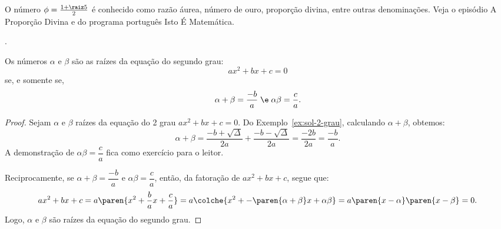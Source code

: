 \begin{remark}
	O número $\phi = \frac {1 + \raiz 5} 2$ é conhecido como razão áurea, número de ouro, proporção divina, entre outras denominações.
	Veja o episódio A Proporção Divina  e  do programa português Isto É Matemática.
\end{remark}

\begin{onlineact}
	.
\end{onlineact}

\begin{theorem}
	Os números $\alpha$ e $\beta$ são as raízes da equação do segundo grau:
	\[
		ax^2 + bx + c = 0
	\]
	se, e somente se,
	\[
		\alpha + \beta = \dfrac {-b} a \; \e \; \alpha \beta = \dfrac c a.
	\]
\end{theorem}

\begin{proof}
	Sejam $\alpha$ e $\beta$ raízes da equação do 2\tdeg{} grau $ax^2 + bx + c = 0$. Do Exemplo~\ref{ex:sol-2-grau}, calculando $\alpha+\beta$, obtemos:
	\[
		\alpha+\beta = \dfrac{-b+\sqrt\Delta}{2a}+\dfrac{-b-\sqrt\Delta}{2a} = \dfrac{-2b}{2a}=\dfrac{-b}{a}.
	\]
	A demonstração de $\alpha\beta = \dfrac c a$ fica como exercício para o leitor.

    Reciprocamente, se $\alpha+\beta = \dfrac {-b} a$ e $\alpha\beta = \dfrac c a$, então, da fatoração de $ax^2 + bx + c$, segue que:
    \[
        ax^2 + bx + c = a\paren{x^2 + \frac {b} a x+ \frac c a} = a\colche{x^2 + -\paren{\alpha+\beta} x+ \alpha\beta} = a\paren{x - \alpha}\paren{x - \beta} = 0.
    \]
    Logo, $\alpha$ e $\beta$ são raízes da equação do segundo grau.
\end{proof}